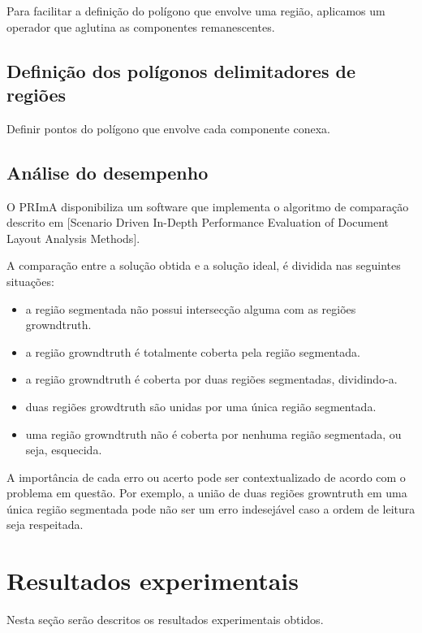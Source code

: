 \documentclass[a4paper,11pt]{article}
\begin{document}
        Para facilitar a definição do polígono que envolve uma região, aplicamos um operador que aglutina as componentes remanescentes.

    \subsection{Definição dos polígonos delimitadores de regiões}

      Definir pontos do polígono que envolve cada componente conexa.

    \subsection{Análise do desempenho}

      O PRImA disponibiliza um software que implementa o algoritmo de comparação descrito em [Scenario Driven In-Depth Performance Evaluation of Document Layout Analysis Methods].

      A comparação entre a solução obtida e a solução ideal, é dividida nas seguintes situações:

      \begin{itemize}
        \item a região segmentada não possui intersecção alguma com as regiões growndtruth.
        \item a região growndtruth é totalmente coberta pela região segmentada.
        \item a região growndtruth é coberta por duas regiões segmentadas, dividindo-a.
        \item duas regiões growdtruth são unidas por uma única região segmentada.
        \item uma região growndtruth não é coberta por nenhuma região segmentada, ou seja, esquecida.
      \end{itemize}

      A importância de cada erro ou acerto pode ser contextualizado de acordo com o problema em questão. Por exemplo, a união de duas regiões growntruth em uma única região segmentada pode não ser um erro indesejável caso a ordem de leitura seja respeitada.





\section{Resultados experimentais}

Nesta seção serão descritos os resultados experimentais obtidos.
\end{document}
